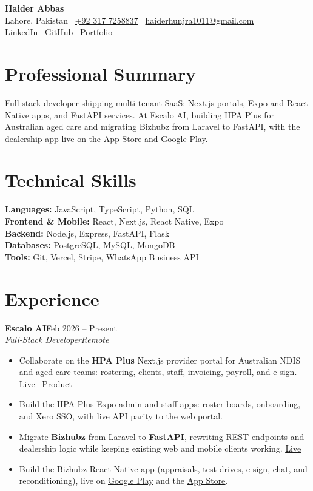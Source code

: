\documentclass[letterpaper,10pt]{article}
\newcommand{\role}[4]{%
  \vspace{3pt}
  \textbf{#1}\hfill #2\\[1pt]
  \textit{#3}\hfill \textit{#4}\par
  \vspace{1pt}
}
\newcommand{\plink}[2]{\href{#1}{\underline{#2}}}
\begin{document}
\begin{center}
  {\fontsize{25}{30}\selectfont\bfseries Haider Abbas}\\[6pt]
  {\small
  Lahore, Pakistan \textbar\ \href{tel:+923177258837}{+92 317 7258837} \textbar\ \href{mailto:haiderhunjra1011@gmail.com}{haiderhunjra1011@gmail.com}\\[2pt]
  \href{https://linkedin.com/in/haider-abbas-7557712b5}{LinkedIn} \textbar\
  \href{https://github.com/https-Haider}{GitHub} \textbar\
  \href{https://haider-abbas-portfolio.vercel.app}{Portfolio}}
\end{center}
\vspace{-2pt}

\section{Professional Summary}
Full-stack developer shipping multi-tenant SaaS: Next.js portals, Expo and React Native apps, and FastAPI services. At Escalo AI, building HPA Plus for Australian aged care and migrating Bizhubz from Laravel to FastAPI, with the dealership app live on the App Store and Google Play.

\section{Technical Skills}
\textbf{Languages:} JavaScript, TypeScript, Python, SQL\\[1pt]
\textbf{Frontend \& Mobile:} React, Next.js, React Native, Expo\\[1pt]
\textbf{Backend:} Node.js, Express, FastAPI, Flask\\[1pt]
\textbf{Databases:} PostgreSQL, MySQL, MongoDB\\[1pt]
\textbf{Tools:} Git, Vercel, Stripe, WhatsApp Business API

\section{Experience}
\role{Escalo AI}{Feb 2026 -- Present}{Full-Stack Developer}{Remote}
\begin{itemize}
  \item Collaborate on the \textbf{HPA Plus} Next.js provider portal for Australian NDIS and aged-care teams: rostering, clients, staff, invoicing, payroll, and e-sign. \plink{https://hpa-plus.vercel.app/}{Live} \textbar\ \plink{https://www.hpaplus.com.au/}{Product}
  \item Build the HPA Plus Expo admin and staff apps: roster boards, onboarding, and Xero SSO, with live API parity to the web portal.
  \item Migrate \textbf{Bizhubz} from Laravel to \textbf{FastAPI}, rewriting REST endpoints and dealership logic while keeping existing web and mobile clients working. \plink{https://bizhubz.vercel.app/sign-in}{Live}
  \item Build the Bizhubz React Native app (appraisals, test drives, e-sign, chat, and reconditioning), live on \plink{https://play.google.com/store/apps/details?id=com.bizhubz.app}{Google Play} and the \plink{https://apps.apple.com/pk/app/bizhubz/id6807721811}{App Store}.
\end{itemize}
\end{document}
